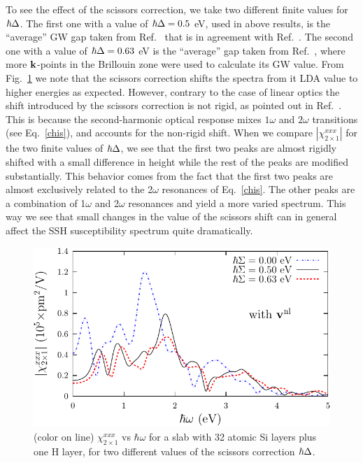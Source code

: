 \documentclass[floatfix,prb,aps,superscriptaddress,11pt,preprint,letterpaper]{revtex4}
\begin{document}
To see the effect of the scissors correction, we take two different
finite values for $\hbar\Delta$. The first one
with a value of $\hbar\Delta=0.5$ eV, used in above results, 
is the ``average'' GW gap taken from 
Ref.~ 
that is in agreement with Ref.~. The second one
with a value of $\hbar\Delta=0.63$ eV is the ``average'' 
gap taken from Ref.~, 
where more $\mathbf{k}$-points in the Brillouin zone were 
used to calculate its GW value.
From Fig.~\ref{fig4}
we note that the scissors correction 
shifts the spectra from it LDA value to higher energies as expected.
 However, contrary 
to the case of linear optics\cite{cabellosPRB09} the shift introduced 
by the scissors correction is not 
rigid, as pointed out in Ref.~. 
 This is because the second-harmonic optical response mixes 
$1\omega$ and $2\omega$ transitions (see Eq.~\eqref{chis}), and accounts 
for the non-rigid shift. 
When we compare 
$|\chi^{xxx}_{2\times 1}|$ for the two finite values of $\hbar\Delta$,
we see that the first two peaks are almost rigidly 
shifted with a small difference in height while
the rest of the peaks are modified substantially. 
This behavior comes from the fact that the first two
peaks are almost exclusively related to the 
2$\omega$ resonances of
Eq.~\eqref{chis}. The other peaks are a combination 
of 1$\omega$ and 2$\omega$ resonances 
and yield a more varied spectrum. 
This way we see that small changes in the value of the 
scissors shift can in general affect the SSH susceptibility 
spectrum quite dramatically.
\begin{figure}
\centering 
\includegraphics[scale=.8]{plots/fig4}
\caption{(color on line) 
$\chi^{xxx}_{2\times 1}$
vs $\hbar\omega$ for a slab with 32 
atomic Si layers plus one H layer, 
for two different values of 
the scissors correction $\hbar\Delta$. 
\label{fig4}} 
\end{figure}
\end{document}
